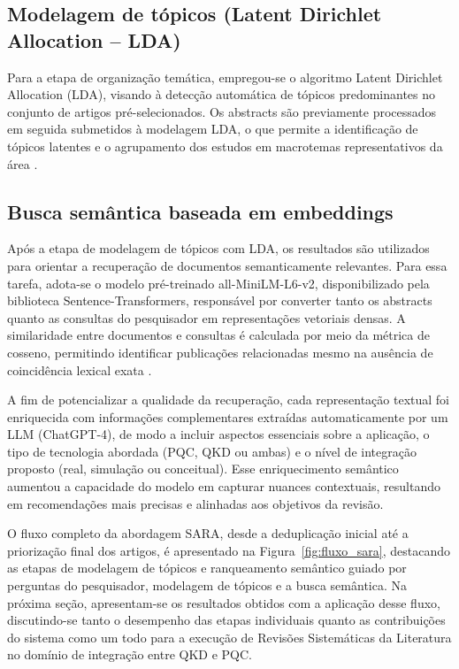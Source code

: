 \documentclass{siintec}
\begin{document}
\subsection{Modelagem de tópicos (Latent Dirichlet Allocation – LDA)}
Para a etapa de organização temática, empregou-se o algoritmo Latent Dirichlet Allocation (LDA)\cite{blei2003latent_LDA}, visando à detecção automática de tópicos predominantes no conjunto de artigos pré-selecionados. Os abstracts são previamente processados em seguida submetidos à modelagem LDA, o que permite a identificação de tópicos latentes e o agrupamento dos estudos em macrotemas representativos da área \cite{egger2022topic_bertTOPIC}.

\subsection{Busca semântica baseada em embeddings}
Após a etapa de modelagem de tópicos com LDA, os resultados são utilizados para orientar a recuperação de documentos semanticamente relevantes. Para essa tarefa, adota-se o modelo pré-treinado all-MiniLM-L6-v2, disponibilizado pela biblioteca Sentence-Transformers, responsável por converter tanto os abstracts quanto as consultas do pesquisador em representações vetoriais densas. A similaridade entre documentos e consultas é calculada por meio da métrica de cosseno, permitindo identificar publicações relacionadas mesmo na ausência de coincidência lexical exata \cite{seo2022ta_sentece_BERT, kamil2025advances_semantic_search}.

A fim de potencializar a qualidade da recuperação, cada representação textual foi enriquecida com informações complementares extraídas automaticamente por um LLM (ChatGPT-4), de modo a incluir aspectos essenciais sobre a aplicação, o tipo de tecnologia abordada (PQC, QKD ou ambas) e o nível de integração proposto (real, simulação ou conceitual). Esse enriquecimento semântico aumentou a capacidade do modelo em capturar nuances contextuais, resultando em recomendações mais precisas e alinhadas aos objetivos da revisão.

O fluxo completo da abordagem SARA, desde a deduplicação inicial até a priorização final dos artigos, é apresentado na Figura~\ref{fig:fluxo_sara}, destacando as etapas de modelagem de tópicos e ranqueamento semântico guiado por perguntas do pesquisador, modelagem de tópicos e a busca semântica. Na próxima seção, apresentam-se os resultados obtidos com a aplicação desse fluxo, discutindo-se tanto o desempenho das etapas individuais quanto as contribuições do sistema como um todo para a execução de Revisões Sistemáticas da Literatura no domínio de integração entre QKD e PQC.
\end{document}
